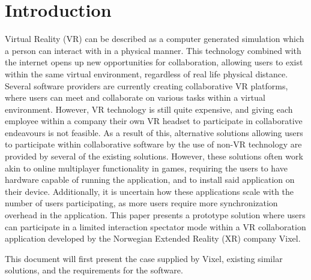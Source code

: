 \section{Introduction}
Virtual Reality (VR) can be described as a computer generated simulation which a person can interact with in a physical manner\cite{vr_definition}. This technology combined with the internet opens up new opportunities for collaboration, allowing users to exist within the same virtual environment, regardless of real life physical distance. Several software providers are currently creating collaborative VR platforms, where users can meet and collaborate on various tasks within a virtual environment. However, VR technology is still quite expensive, and giving each employee within a company their own VR headset to participate in collaborative endeavours is not feasible. As a result of this, alternative solutions allowing users to participate within collaborative software by the use of non-VR technology are provided by several of the existing solutions\cite{rumii_vr, insite_vr}. However, these solutions often work akin to online multiplayer functionality in games, requiring the users to have hardware capable of running the application, and to install said application on their device. Additionally, it is uncertain how these applications scale with the number of users participating, as more users require more synchronization overhead in the application. This paper presents a prototype solution where users can participate in a limited interaction spectator mode within a VR collaboration application developed by the Norwegian Extended Reality (XR) company Vixel.

This document will first present the case supplied by Vixel, existing similar solutions, and the requirements for the software. 

